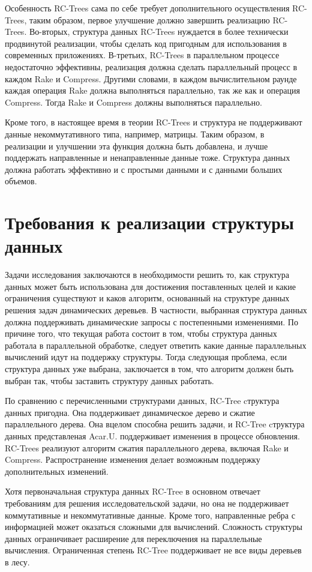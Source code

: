 \documentclass[specification,annotation]{itmo-student-thesis}
\begin{document}
Особенность RC-Trees сама по себе требует дополнительного осуществления RC-Trees, таким образом, первое улучшение должно завершить реализацию RC-Trees. Во-вторых, структура данных RC-Trees нуждается в более 
технически продвинутой реализации, чтобы сделать код пригодным для использования в современных приложениях. В-третьих, RC-Trees в параллельном процессе недостаточно эффективны, реализация должна сделать параллельный процесс в каждом Rake и Compress. Другими словами, в каждом вычислительном раунде каждая операция Rake должна выполняться 
параллельно, так же как и операция Compress. Тогда Rake и Compress должны выполняться параллельно.

Кроме того, в настоящее время в теории RC-Trees и структура не поддерживают данные некоммутативного типа, например, матрицы. Таким образом, в реализации и улучшении эта функция должна быть добавлена, и лучше поддержать направленные и ненаправленные данные тоже. Структура данных должна работать эффективно и с простыми данными и с данными больших объемов.


\section{Требования к реализации структуры данных}


Задачи исследования заключаются в необходимости решить то, как структура данных может быть использована для достижения поставленных целей и какие ограничения существуют и каков алгоритм, основанный на структуре данных 
решения задач динамических деревьев. В частности, выбранная структура данных должна поддерживать динамические запросы с постепенными изменениями. По причине того, что текущая работа состоит в том, чтобы структура данных работала в параллельной обработке, следует ответить какие данные параллельных вычислений идут на поддержку структуры. Тогда следующая проблема, если структура данных уже выбрана, заключается в том, что алгоритм должен быть выбран так, чтобы заставить структуру данных работать. 

По сравнению с перечисленными структурами данных, RC-Tree cтруктура данных пригодна. Она поддерживает динамическое дерево и сжатие 
параллельного дерева. Она вцелом способна решить задачи, и RC-Tree cтруктура данных представленая  Acar.U. поддерживает изменения в процессе обновления. RC-Trees реализуют алгоритм сжатия параллельного дерева, включая Rake и Compress. Распространение изменения делает возможным поддержку дополнительных изменений.

Хотя первоначальная структура данных RC-Tree в основном отвечает требованиям для решения исследовательской задачи, но она не поддерживает коммутативные и некоммутативные данные. Кроме того, направленные ребра с 
информацией может оказаться сложными для вычислений. Сложность структуры данных ограничивает расширение для переключения на параллельные вычисления. Ограниченная степень RC-Tree поддерживает не все виды деревьев в лесу.
\end{document}
